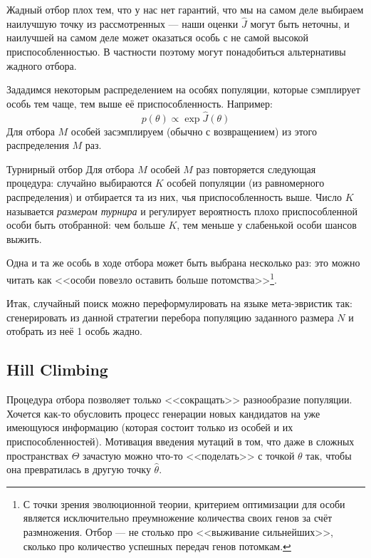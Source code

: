 Жадный отбор плох тем, что у нас нет гарантий, что мы на самом деле выбираем наилучшую точку из рассмотренных --- наши оценки $\hat{J}$ могут быть неточны, и наилучшей на самом деле может оказаться особь с не самой высокой приспособленностью. В частности поэтому могут понадобиться альтернативы жадного отбора.

\begin{example}
Зададимся некоторым распределением на особях популяции, которые сэмплирует особь тем чаще, тем выше её приспособленность. Например:
$$p(\theta) \propto \exp{\hat{J}(\theta)}$$
Для отбора $M$ особей засэмплируем (обычно с возвращением) из этого распределения $M$ раз.
\end{example}

\begin{exampleBox}[label=ex:tournir]{Турнирный отбор}
Для отбора $M$ особей $M$ раз повторяется следующая процедура: случайно выбираются $K$ особей популяции (из равномерного распределения) и отбирается та из них, чья приспособленность выше. Число $K$ называется \emph{размером турнира} и регулирует вероятность плохо приспособленной особи быть отобранной: чем больше $K$, тем меньше у слабенькой особи шансов выжить.
\end{exampleBox}

Одна и та же особь в ходе отбора может быть выбрана несколько раз: это можно читать как <<особи повезло оставить больше потомства>>\footnote{С точки зрения эволюционной теории, критерием оптимизации для особи является исключительно преумножение количества своих генов за счёт размножения. Отбор --- не столько про <<выживание сильнейших>>, сколько про количество успешных передач генов потомкам.}.

Итак, случайный поиск можно переформулировать на языке мета-эвристик так: сгенерировать из данной стратегии перебора популяцию заданного размера $N$ и отобрать из неё 1 особь жадно.

\subsection{Hill Climbing}

Процедура отбора позволяет только <<сокращать>> разнообразие популяции. Хочется как-то обусловить процесс генерации новых кандидатов на уже имеющуюся информацию (которая состоит только из особей и их приспособленностей). Мотивация введения мутаций в том, что даже в сложных пространствах $\Theta$ зачастую можно что-то <<поделать>> с точкой $\theta$ так, чтобы она превратилась в другую точку $\hat{\theta}$.

